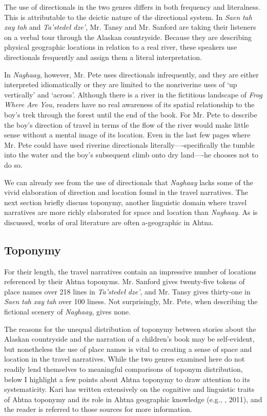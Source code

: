 \noindent
The use of directionals in the two genres differs in both frequency and literalness. This is attributable to the deictic nature of the directional system. In \textit{Saen} \textit{tah} \textit{xay} \textit{tah} and \textit{Ta’stedeł} \textit{dze’}, Mr. Tansy and Mr. Sanford are taking their listeners on a verbal tour through the Alaskan countryside. Because they are describing physical geographic locations in relation to a real river, these speakers use directionals frequently and assign them a literal interpretation.

In \textit{Naghaay}, however, Mr. Pete uses directionals infrequently, and they are either interpreted idiomatically or they are limited to the nonriverine uses of ‘up vertically’ and ‘across’. Although there is a river in the fictitious landscape of \textit{Frog} \textit{Where} \textit{Are} \textit{You,} readers have no real awareness of its spatial relationship to the boy’s trek through the forest until the end of the book. For Mr. Pete to describe the boy’s direction of travel in terms of the flow of the river would make little sense without a mental image of its location. Even in the last few pages where Mr. Pete could have used riverine directionals literally—-specifically the tumble into the water and the boy’s subsequent climb onto dry land—-he chooses not to do so.

We can already see from the use of directionals that \textit{Naghaay} lacks some of the vivid elaboration of direction and location found in the travel narratives. The next section briefly discuss toponymy, another linguistic domain where travel narratives are more richly elaborated for space and location than \textit{Naghaay}. As is discussed, works of oral literature are often a-geographic in Ahtna.

\subsection{Toponymy}

For their length, the travel narratives contain an impressive number of locations referenced by their Ahtna toponyms. Mr. Sanford gives twenty-five tokens of place names over 218 lines in \textit{Ta’stedeł} \textit{dze’}, and Mr. Tansy gives thirty-one in \textit{Saen} \textit{tah} \textit{xay} \textit{tah} over 100 liness. Not surprisingly, Mr. Pete, when describing the fictional scenery of \textit{Naghaay}, gives none.

The reasons for the unequal distribution of toponymy between stories about the Alaskan countryside and the narration of a children’s book may be self-evident, but nonetheless the use of place names is vital to creating a sense of space and location in the travel narratives. While the two genres examined here do not readily lend themselves to meaningful comparisons of toponym distribution, below I highlight a few points about Ahtna toponymy to draw attention to its systematicity. Kari has written extensively on the cognitive and linguistic traits of Ahtna toponymy and its role in Ahtna geographic knowledge (e.g., \citealt{Kari2008}, 2011), and the reader is referred to those sources for more information.

